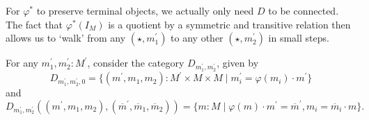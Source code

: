 \begin{remark}
  For $ \varphi^* $ to preserve terminal objects, we actually only need $ D $ to be connected. The fact that $ \varphi^*(I_M) $ is a quotient by a symmetric and transitive relation then allows us to `walk' from any $ (\star, m^\prime_1) $ to any other $ (\star, m^\prime_2) $ in small steps.
\end{remark}

For any $ m^\prime_1, m^\prime_2: M^\prime $, consider the category $ D_{m^\prime_1, m^\prime_2} $, given by
\[ D_{m^\prime_1, m^\prime_2, 0} = \{ (m^\prime, m_1, m_2): M^\prime \times M \times M \mid m_i^\prime = \varphi(m_i) \cdot m^\prime \} \]
and
\[ D_{m^\prime_1, m^\prime_2}((m^\prime, m_1, m_2), (\overline m^\prime, \overline m_1, \overline m_2)) = \{ m: M \mid \varphi(m) \cdot m^\prime = \overline m^\prime, m_i = \overline m_i \cdot m \}. \]

